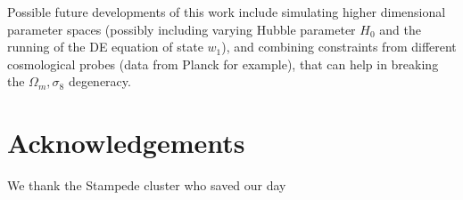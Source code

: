 \documentclass[reprint,aps,prd,superscriptaddress,showkeys,showpacs]{revtex4-1}
\begin{document}
Possible future developments of this work include simulating higher dimensional parameter spaces (possibly including varying Hubble parameter $H_0$ and the running of the DE equation of state $w_1$), and combining constraints from different cosmological probes (data from Planck for example), that can help in breaking the $\Omega_m,\sigma_8$ degeneracy. 

 

\section*{Acknowledgements}
We thank the Stampede cluster who saved our day


\label{lastpage}
\end{document}
